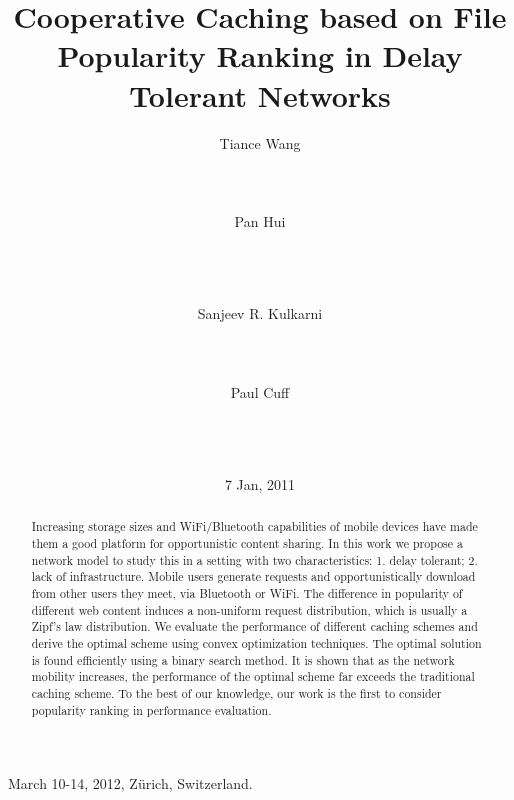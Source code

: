 \documentclass{sig-alternate}
\begin{document}
 {March 10-14, 2012, Z\"{u}rich, Switzerland.}

\title{Cooperative Caching based on File Popularity Ranking in Delay Tolerant Networks}


\author{
\alignauthor
Tiance Wang\\
       \\
       \\
       \\
\alignauthor
Pan Hui\\
       \\
       \\
       \\
\and
\alignauthor       
Sanjeev R. Kulkarni\\
       \\
       \\
       \\
\alignauthor
Paul Cuff\\
       \\
       \\
       \\
}
\date{7 Jan, 2011}

\maketitle
\begin{abstract}
Increasing storage sizes and WiFi/Bluetooth capabilities of mobile devices have made them a good platform for opportunistic content sharing. 
In this work we propose a network model to study this in a setting with two characteristics: 1. delay tolerant; 2. lack of infrastructure. Mobile users generate requests and opportunistically download from other users they meet, via Bluetooth or WiFi. The difference in popularity of different web content induces a non-uniform request distribution, which is usually a Zipf's law distribution. We evaluate the performance of different caching schemes and derive the optimal scheme using convex optimization techniques. The optimal solution is found efficiently using a binary search method. It is shown that as the network mobility increases, the performance of the optimal scheme far exceeds the traditional caching scheme. To the best of our knowledge, our work is the first to consider popularity ranking in performance evaluation. 
\end{abstract}
\end{document}
